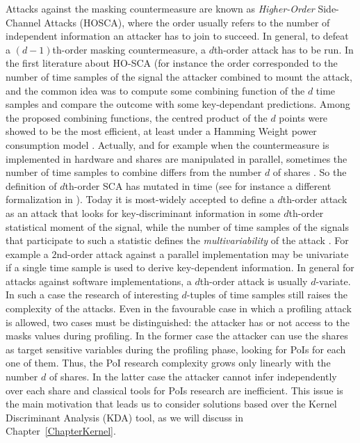 Attacks against the masking countermeasure are known as \emph{Higher-Order} Side-Channel Attacks (HOSCA), where the order usually refers to the number of independent information an attacker has to join to succeed. In general, to defeat a $(d-1)$th-order masking countermeasure, a $d$th-order attack has to be run. In the first literature about HO-SCA (for instance \cite{messerges2000using,Waddle2004,joye2005second,oswald2006practical} the order corresponded to the number of time samples of the signal the attacker combined to mount the attack, and the common idea was to compute some combining function of the $d$ time samples and compare the outcome with some key-dependant predictions. Among the proposed combining functions, the centred product of the $d$ points were showed to be the most efficient, at least under a Hamming Weight power consumption model \cite{DBLP:journals/tc/ProuffRB09}. Actually, and for example when the countermeasure is implemented in hardware and shares are manipulated in parallel, sometimes the number of time samples to combine differs from the number $d$ of shares \cite{peeters2005improved,standaert2005masking}. So the definition of $d$th-order SCA has mutated in time (see for instance a different formalization in \cite{piret2008security}). Today it is most-widely accepted to define a $d$th-order attack as an attack that looks for key-discriminant information in some $d$th-order statistical moment of the signal, while the number of time samples of the signals that participate to such a statistic defines the \emph{multivariability} of the attack \cite{gierlichs2010revisiting,batina2011mutual,carlet2014achieving}. For example a $2$nd-order attack against a parallel implementation may be univariate if a single time sample is used to derive key-dependent information. In general for attacks against software implementations, a $d$th-order attack is usually $d$-variate. In such a case the research of interesting $d$-tuples of time samples still raises the complexity of the attacks. Even in the favourable case in which a profiling attack is allowed, two cases must be distinguished: the attacker has or not access to the masks values during profiling. In the former case the attacker can use the shares as target sensitive variables during the profiling phase, looking for PoIs for each one of them. Thus, the PoI research complexity grows only linearly with the number $d$ of shares. In the latter case the attacker cannot infer independently over each share and classical tools for PoIs research are inefficient. This issue is the main motivation that leads us to consider solutions based over the Kernel Discriminant Analysis (KDA) tool, as we will discuss in Chapter~\ref{ChapterKernel}.




